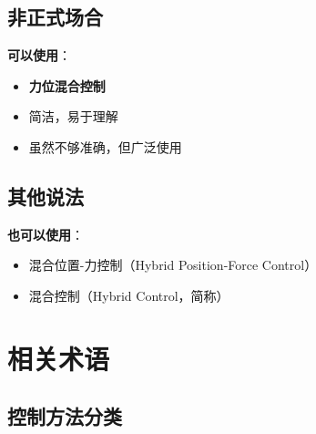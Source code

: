 \documentclass[12pt,a4paper]{article}
\begin{document}
\subsection{非正式场合}

\textbf{可以使用}：
\begin{itemize}
\item \textbf{力位混合控制}
\item 简洁，易于理解
\item 虽然不够准确，但广泛使用
\end{itemize}

\subsection{其他说法}

\textbf{也可以使用}：
\begin{itemize}
\item 混合位置-力控制（Hybrid Position-Force Control）
\item 混合控制（Hybrid Control，简称）
\end{itemize}

\section{相关术语}

\subsection{控制方法分类}
\end{document}
